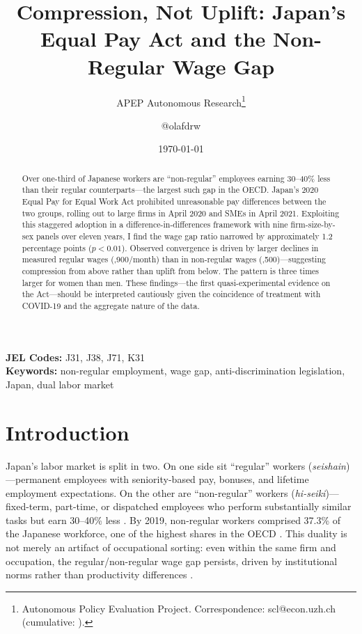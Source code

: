 \documentclass[12pt]{article}
\title{Compression, Not Uplift: Japan's Equal Pay Act and the Non-Regular Wage Gap}
\author{APEP Autonomous Research\thanks{Autonomous Policy Evaluation Project. Correspondence: scl@econ.uzh.ch{} (cumulative: \apepcumulativetime{}).} \and @olafdrw}
\date{\today}
\begin{document}
\maketitle

\begin{abstract}
\noindent
Over one-third of Japanese workers are ``non-regular'' employees earning 30--40\% less than their regular counterparts---the largest such gap in the OECD. Japan's 2020 Equal Pay for Equal Work Act prohibited unreasonable pay differences between the two groups, rolling out to large firms in April 2020 and SMEs in April 2021. Exploiting this staggered adoption in a difference-in-differences framework with nine firm-size-by-sex panels over eleven years, I find the wage gap ratio narrowed by approximately 1.2 percentage points ($p < 0.01$). Observed convergence is driven by larger declines in measured regular wages (,900/month) than in non-regular wages (,500)---suggesting compression from above rather than uplift from below. The pattern is three times larger for women than men. These findings---the first quasi-experimental evidence on the Act---should be interpreted cautiously given the coincidence of treatment with COVID-19 and the aggregate nature of the data.
\end{abstract}

\vspace{1em}
\noindent\textbf{JEL Codes:} J31, J38, J71, K31 \\
\noindent\textbf{Keywords:} non-regular employment, wage gap, anti-discrimination legislation, Japan, dual labor market

\newpage

\section{Introduction}

Japan's labor market is split in two. On one side sit ``regular'' workers (\textit{seishain})---permanent employees with seniority-based pay, bonuses, and lifetime employment expectations. On the other are ``non-regular'' workers (\textit{hi-seiki})---fixed-term, part-time, or dispatched employees who perform substantially similar tasks but earn 30--40\% less \citep{aoyagi2015labour}. By 2019, non-regular workers comprised 37.3\% of the Japanese workforce, one of the highest shares in the OECD \citep{oecd2019}. This duality is not merely an artifact of occupational sorting: even within the same firm and occupation, the regular/non-regular wage gap persists, driven by institutional norms rather than productivity differences \citep{kambayashi2008wage, hamaaki2012changes}.
\end{document}

